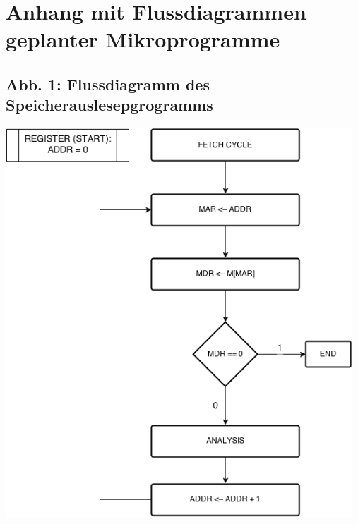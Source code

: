 \documentclass[12pt,titlepage]{article}
\begin{document}
\section{Anhang mit Flussdiagrammen \\ geplanter Mikroprogramme}

\subsection{Abb. 1: Flussdiagramm des Speicherauslesepgrogramms}

\includegraphics[width=13cm]{readFromMemory.png}
\end{document}
